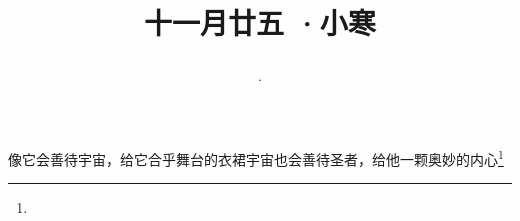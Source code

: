 \title{\date[d=6,m=1,y=2024][year:cn-y,年,month:cn,day:cn,日,·,weekday]·十一月廿五 ·小寒}
像它会善待宇宙，给它合乎舞台的衣裙宇宙也会善待圣者，给他一颗奥妙的内心\footnote{ }


